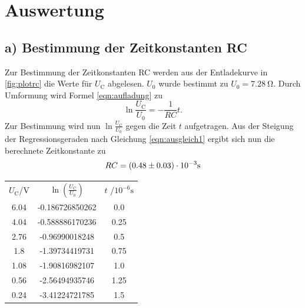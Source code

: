 \section{Auswertung}
\label{sec:Auswertung}
\subsection{a) Bestimmung der Zeitkonstanten RC}
Zur Bestimmung der Zeitkonstanten RC werden aus der Entladekurve in \ref{fig:plotrc} die Werte für $U_\text{C}$ abgelesen.
$U_\text{0}$ wurde bestimmt zu $U_\text{0}=\SI{7.28}{\ohm} $.
Durch Umformung wird Formel \eqref{eqn:aufladung} zu
\begin{equation}
\label{eqn:ausgleich1}
\ln{\frac{U_\text{C}}{U_\text{0}}}=-\frac{1}{RC}t .
\end{equation}
Zur Bestimmung wird nun $\ln{\frac{U_\text{C}}{U_\text{0}}}$ gegen die Zeit $t$ aufgetragen.
Aus der Steigung der Regressionsgeraden nach Gleichung \eqref{eqn:ausgleich1} ergibt sich nun die berechnete Zeitkonstante zu
\begin{equation*}
  \centering
  RC = (0.48 \pm 0.03) \cdot 10^{-3} \si{\second}
\end{equation*}
\begin{table}
\begin{tabular}{ccc}
$U_\text{C}$/$\si{\volt}$ & $\ln{(\frac{U_\text{C}}{U_\text{0}})}$ & $t$ /$10^{-6}\si{\second}$ \\
6.04 & -0.186726850262 & 0.0 \\
4.04 & -0.588886170236 & 0.25 \\
2.76 & -0.96990018248 & 0.5 \\
1.8 & -1.39734419731 & 0.75 \\
1.08 & -1.90816982107 & 1.0 \\
0.56 & -2.56494935746 & 1.25 \\
0.24 & -3.41224721785 & 1.5 \\
\end{tabular}
\end{table}

